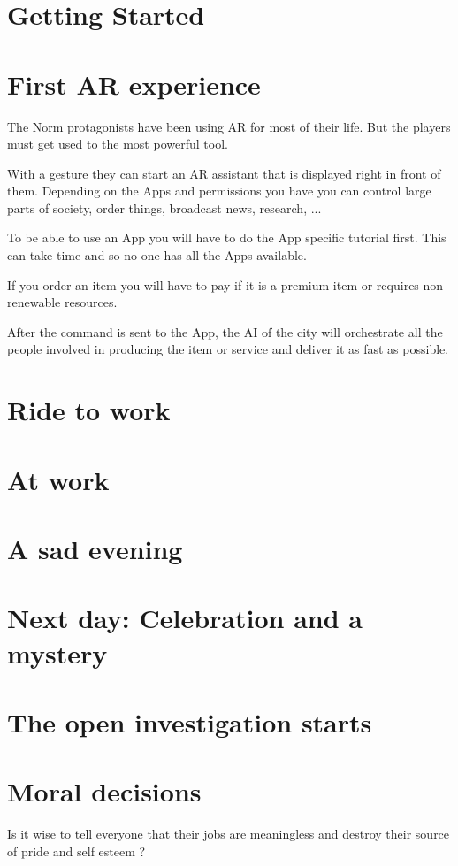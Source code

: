 \section{Getting Started}

\section{First AR experience}

The Norm protagonists have been using AR for most of their life. But the players must get used to the most powerful tool.

With a gesture they can start an AR assistant that is displayed right in front of them. Depending on the Apps and permissions you have you can control large parts of society, order things, broadcast news, research, ...

To be able to use an App you will have to do the App specific tutorial first. This can take time and so no one has all the Apps available.

If you order an item you will have to pay if it is a premium item or requires non-renewable resources.

After the command is sent to the App, the AI of the city will orchestrate all the people involved in producing the item or service and deliver it as fast as possible.

\section{Ride to work}

\section{At work}

\section{A sad evening}

\section{Next day: Celebration and a mystery}

\section{The open investigation starts}

\section{Moral decisions}

Is it wise to tell everyone that their jobs are meaningless and destroy their source of pride and self esteem ?
